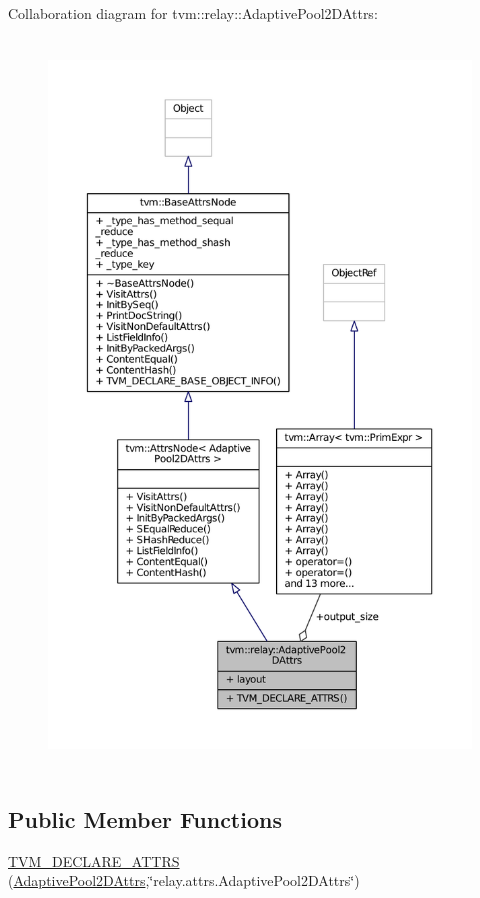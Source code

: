 Collaboration diagram for tvm\+:\+:relay\+:\+:Adaptive\+Pool2\+D\+Attrs\+:
\nopagebreak
\begin{figure}[H]
\begin{center}
\leavevmode
\includegraphics[height=550pt]{structtvm_1_1relay_1_1AdaptivePool2DAttrs__coll__graph}
\end{center}
\end{figure}
\subsection*{Public Member Functions}
\begin{DoxyCompactItemize}
\item 
\hyperlink{structtvm_1_1relay_1_1AdaptivePool2DAttrs_a948bd68b55ffa2a02fedb9fa3b0fecd5}{T\+V\+M\+\_\+\+D\+E\+C\+L\+A\+R\+E\+\_\+\+A\+T\+T\+RS} (\hyperlink{structtvm_1_1relay_1_1AdaptivePool2DAttrs}{Adaptive\+Pool2\+D\+Attrs},\char`\"{}relay.\+attrs.\+Adaptive\+Pool2\+D\+Attrs\char`\"{})
\end{DoxyCompactItemize}
